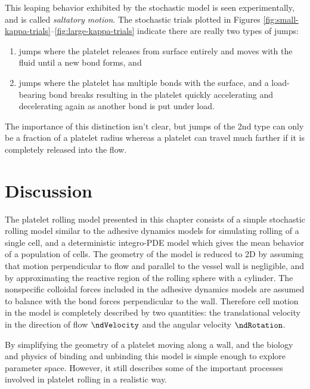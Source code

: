 This leaping behavior exhibited by the stochastic model is
seen experimentally, and is called \emph{saltatory
  motion}. The stochastic trials plotted in Figures
\ref{fig:small-kappa-trials}--\ref{fig:large-kappa-trials} indicate
there are really two types of jumps:
\begin{enumerate}
\item jumps where the platelet releases from surface entirely and
  moves with the fluid until a new bond forms, and
\item jumps where the platelet has multiple bonds with the surface,
  and a load-bearing bond breaks resulting in the platelet quickly
  accelerating and decelerating again as another bond is put under load.
\end{enumerate}
The importance of this distinction isn't clear, but jumps of the 2nd
type can only be a fraction of a platelet radius whereas a platelet
can travel much farther if it is completely released into the flow.

\section{Discussion}
\label{sec:discussion}

The platelet rolling model presented in this chapter consists of a
simple stochastic rolling model similar to the adhesive dynamics
models for simulating rolling of a single cell, and a deterministic
integro-PDE model which gives the mean behavior of a population of
cells. The geometry of the model is reduced to 2D by assuming that
motion perpendicular to flow and parallel to the vessel wall is
negligible, and by approximating the reactive region of the rolling
sphere with a cylinder. The nonspecific colloidal forces included in
the adhesive dynamics models \cite{Hammer2014} are assumed to balance
with the bond forces perpendicular to the wall. Therefore cell motion
in the model is completely described by two quantities: the
translational velocity in the direction of flow $\ndVelocity$ and the
angular velocity $\ndRotation$.

By simplifying the geometry of a platelet moving along a wall, and the
biology and physics of binding and unbinding this model is simple
enough to explore parameter space. However, it still describes some of
the important processes involved in platelet rolling in a realistic way.



